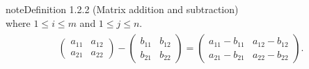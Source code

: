 \documentclass[letterpaper,10pt,english]{jupyterBook}
\begin{document}
\begin{sphinxadmonition}{note}{Definition 1.2.2 (Matrix addition and subtraction)}
\begin{equation}
\end{equation}
\sphinxAtStartPar
where \(1 \leq i \leq m\) and \(1 \leq j \leq n\).
\begin{equation*}
\begin{split} \begin{align*}
    \begin{pmatrix}
        a_{11} & a_{12} \\
        a_{21} & a_{22}
    \end{pmatrix} -
    \begin{pmatrix}
        b_{11} & b_{12} \\
        b_{21} & b_{22}
    \end{pmatrix} =
    \begin{pmatrix}
        a_{11} - b_{11} & a_{12} - b_{12} \\
        a_{21} - b_{21} & a_{22} - b_{22}
    \end{pmatrix}.
\end{align*} \end{split}
\end{equation*}\end{sphinxadmonition}
\end{document}
